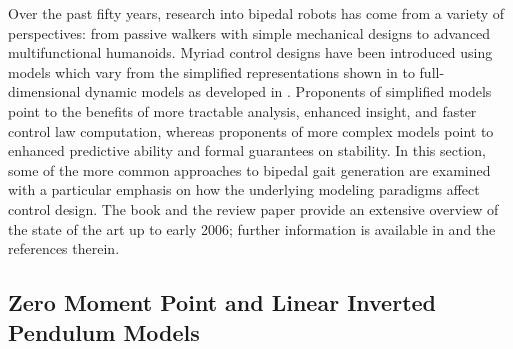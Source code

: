 Over the past fifty years, research into bipedal robots has come from a variety of perspectives: from passive walkers with simple mechanical designs to advanced multifunctional humanoids.
%
Myriad control designs have been introduced using models which vary from the simplified representations shown in  to full-dimensional dynamic models as developed in .
%
Proponents of simplified models point to the benefits of more tractable analysis, enhanced insight, and faster control law computation, whereas proponents of more complex models point to enhanced predictive ability and formal guarantees on stability.
%
In this section, some of the more common approaches to bipedal gait generation are examined with a particular emphasis on how the underlying modeling paradigms affect control design.
%
The book \cite{Westervelt2007} and the review paper \cite{Hurmuzlu2004} provide an extensive overview of the state of the art up to early 2006; further information is available in \cite{Full1999,Holmes2006,Wisse2007,Kuo2007,Siciliano2008,Chevallereau2009,Sadati2012} and the references therein.

\subsection{Zero Moment Point and Linear Inverted Pendulum Models}


